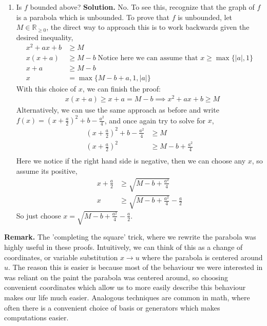 \documentclass[10.5pt]{article}
\theoremstyle{definition}
\newcommand{\set}[1]{\{#1\}}
\newcommand{\abs}[1]{\lvert#1\rvert}
\begin{document}
\begin{enumerate}
        \item Is \(f\) bounded above? \newline
        \textbf{Solution.} No. To see this, recognize that the graph of \(f\) is a parabola which is unbounded.
        To prove that \(f\) is unbounded, let \(M \in \mathbb{R}_{\geq 0}\), the direct way to approach this is to work backwards given the desired inequality,
        \begin{align*}
            x^2 + ax + b &\geq M \\
            x(x + a) &\geq M - b \; \text{Notice here we can assume that } x\geq \max\set{\abs{a},1}\\
            x + a &\geq M - b\\
            x &= \max\set{M-b+a,1,\abs{a}}
        \end{align*}
        With this choice of \(x\), we can finish the proof:
        \begin{align*}
            &x(x+a) \geq x + a = M - b \implies x^2 + ax + b \geq M
        \end{align*}
        Alternatively, we can use the same approach as before and write \(f(x) = \left(x+\frac{a}{2}\right)^2 + b - \frac{a^2}{4}\), and once again try to solve for \(x\),
        \begin{align*}
            \left(x+\frac{a}{2}\right)^2 + b - \frac{a^2}{4} &\geq M \\
            \left(x+\frac{a}{2}\right)^2 &\geq M - b + \frac{a^2}{4} \\
        \end{align*}
        Here we notice if the right hand side is negative, then we can choose any \(x\), so assume its positive,
        \begin{align*}
            x + \frac{a}{2} &\geq \sqrt{M - b + \frac{a^2}{4}} \\
            x &\geq \sqrt{M - b + \frac{a^2}{4}} - \frac{a}{2}
        \end{align*}
        So just choose \(x = \sqrt{M - b + \frac{a^2}{4}} - \frac{a}{2}\).
    \end{enumerate}

    \textbf{Remark.} The 'completing the square' trick, where we rewrite the parabola was highly useful in these proofs.
    Intuitively, we can think of this as a change of coordinates, or variable substitution \(x \to u\) where the parabola is centered around \(u\). The reason this
    is easier is because most of the behaviour we were interested in was reliant on the paint the parabola was centered around, so choosing convenient coordinates
    which allow us to more easily describe this behaviour makes our life much easier. Analogous techniques are common in math, where often there is a
    convenient choice of basis or generators which makes computations easier.
\end{document}

